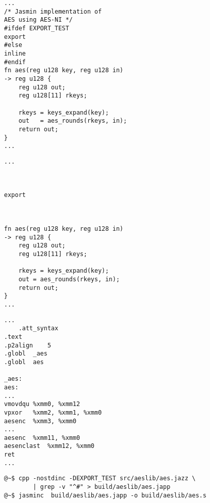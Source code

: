 \begin{center}
\begin{minipage}{.3\textwidth}
\begin{lstlisting}[style=jasmin, caption={aes.jazz}, captionpos=t]
...
/* Jasmin implementation of 
AES using AES-NI */
#ifdef EXPORT_TEST
export
#else
inline
#endif
fn aes(reg u128 key, reg u128 in) 
-> reg u128 {
	reg u128 out;
	reg u128[11] rkeys;
	
	rkeys = keys_expand(key);
	out   = aes_rounds(rkeys, in);
	return out;
}
...
\end{lstlisting}
\end{minipage}\hfill
\begin{minipage}{.3\textwidth}
\begin{lstlisting}[style=jasmin, caption={aes.japp}, captionpos=t]
...



export



fn aes(reg u128 key, reg u128 in)
-> reg u128 {
	reg u128 out;
	reg u128[11] rkeys;
	
	rkeys = keys_expand(key);
	out = aes_rounds(rkeys, in);
	return out;
}
...
\end{lstlisting}
\end{minipage}\hfill
\begin{minipage}{.3\textwidth}
\begin{lstlisting}[style=jasmin, caption={aes.s}, captionpos=t]
...
	.att_syntax
.text
.p2align	5
.globl	_aes
.globl	aes

_aes:
aes:
...
vmovdqu	%xmm0, %xmm12
vpxor	%xmm2, %xmm1, %xmm0
aesenc	%xmm3, %xmm0
...
aesenc	%xmm11, %xmm0
aesenclast	%xmm12, %xmm0
ret
...
\end{lstlisting}
\end{minipage}
\end{center}
\vfill
\begin{lstlisting}[style=normal]
@~$ cpp -nostdinc -DEXPORT_TEST src/aeslib/aes.jazz \
		| grep -v "^#" > build/aeslib/aes.japp
@~$ jasminc  build/aeslib/aes.japp -o build/aeslib/aes.s
\end{lstlisting}
\newpage

